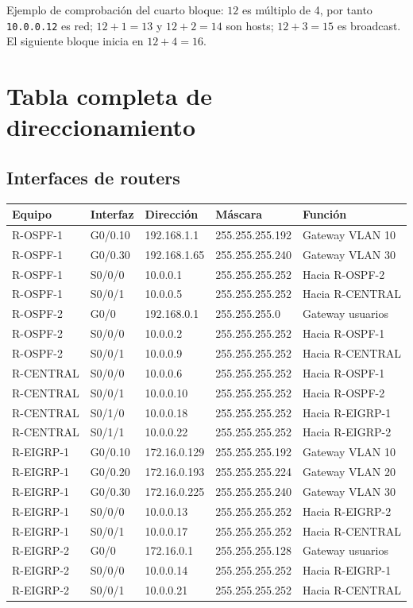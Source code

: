 \documentclass[11pt]{article}
\begin{document}
Ejemplo de comprobación del cuarto bloque: $12$ es múltiplo de 4, por tanto \texttt{10.0.0.12} es red; $12+1=13$ y $12+2=14$ son hosts; $12+3=15$ es broadcast. El siguiente bloque inicia en $12+4=16$.

\section{Tabla completa de direccionamiento}

\subsection{Interfaces de routers}
\small
\begin{longtable}{p{2.5cm}p{2.5cm}p{2.8cm}p{2.8cm}p{3.2cm}}
\toprule
Equipo & Interfaz & Dirección & Máscara & Función\\
\midrule
\endhead
R-OSPF-1 & G0/0.10 & 192.168.1.1 & 255.255.255.192 & Gateway VLAN 10\\
R-OSPF-1 & G0/0.30 & 192.168.1.65 & 255.255.255.240 & Gateway VLAN 30\\
R-OSPF-1 & S0/0/0 & 10.0.0.1 & 255.255.255.252 & Hacia R-OSPF-2\\
R-OSPF-1 & S0/0/1 & 10.0.0.5 & 255.255.255.252 & Hacia R-CENTRAL\\
R-OSPF-2 & G0/0 & 192.168.0.1 & 255.255.255.0 & Gateway usuarios\\
R-OSPF-2 & S0/0/0 & 10.0.0.2 & 255.255.255.252 & Hacia R-OSPF-1\\
R-OSPF-2 & S0/0/1 & 10.0.0.9 & 255.255.255.252 & Hacia R-CENTRAL\\
R-CENTRAL & S0/0/0 & 10.0.0.6 & 255.255.255.252 & Hacia R-OSPF-1\\
R-CENTRAL & S0/0/1 & 10.0.0.10 & 255.255.255.252 & Hacia R-OSPF-2\\
R-CENTRAL & S0/1/0 & 10.0.0.18 & 255.255.255.252 & Hacia R-EIGRP-1\\
R-CENTRAL & S0/1/1 & 10.0.0.22 & 255.255.255.252 & Hacia R-EIGRP-2\\
R-EIGRP-1 & G0/0.10 & 172.16.0.129 & 255.255.255.192 & Gateway VLAN 10\\
R-EIGRP-1 & G0/0.20 & 172.16.0.193 & 255.255.255.224 & Gateway VLAN 20\\
R-EIGRP-1 & G0/0.30 & 172.16.0.225 & 255.255.255.240 & Gateway VLAN 30\\
R-EIGRP-1 & S0/0/0 & 10.0.0.13 & 255.255.255.252 & Hacia R-EIGRP-2\\
R-EIGRP-1 & S0/0/1 & 10.0.0.17 & 255.255.255.252 & Hacia R-CENTRAL\\
R-EIGRP-2 & G0/0 & 172.16.0.1 & 255.255.255.128 & Gateway usuarios\\
R-EIGRP-2 & S0/0/0 & 10.0.0.14 & 255.255.255.252 & Hacia R-EIGRP-1\\
R-EIGRP-2 & S0/0/1 & 10.0.0.21 & 255.255.255.252 & Hacia R-CENTRAL\\
\bottomrule
\end{longtable}
\end{document}

